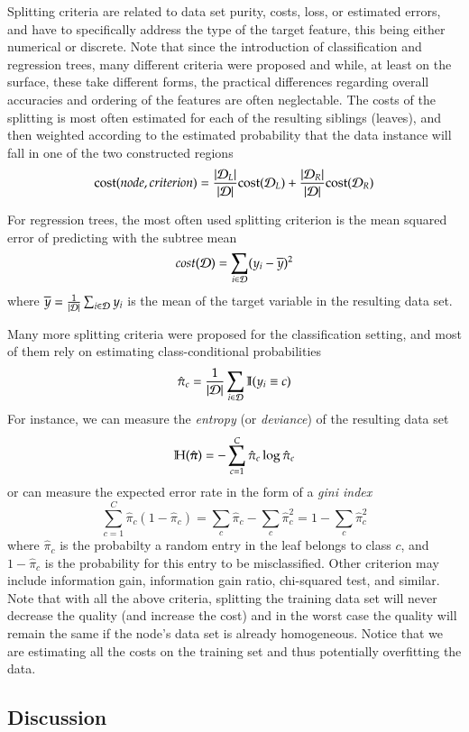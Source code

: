 \begin{refsection}
Splitting criteria are related to data set purity, costs, loss, or estimated errors, and have to specifically address the type of the target feature, this being either numerical or discrete. Note that since the introduction of classification and regression trees, many different criteria were proposed and while, at least on the surface, these take different forms, the practical differences regarding overall accuracies and ordering of the features are often neglectable. The costs of the splitting is most often estimated for each of the resulting siblings (leaves), and then weighted according to the estimated probability that the data instance will fall in one of the two constructed regions
$$ {\rm cost}(node, criterion) = {|\mathcal{D}_L|\over |\mathcal{D}|}{\rm cost}(\mathcal{D}_L) + {|\mathcal{D}_R|\over |\mathcal{D}|}{\rm cost}(\mathcal{D}_R) $$

For regression trees, the most often used splitting criterion is the mean squared error of predicting with the subtree mean
$$ cost(\mathcal{D}) = \sum_{i\in\mathcal{D}}(y_i-\overline{y})^2 $$
where $\overline{y} = {1\over|\mathcal{D}|}\sum_{i\in\mathcal{D}}y_i$ is the mean of the target variable in the resulting data set.

Many more splitting criteria were proposed for the classification setting, and most of them rely on estimating class-conditional probabilities
$$ \hat{\pi}_c = {1\over|\mathcal{D}|}\sum_{i\in\mathcal{D}}\mathbb{I}(y_i\equiv c) $$
For instance, we can measure the {\em entropy} (or {\em deviance}) of the resulting data set
$$ \mathbb{H}(\hat{\boldsymbol{\pi}}) = -\sum_{c=1}^C \hat{\pi}_c \log \hat{\pi}_c $$
or can measure the expected error rate in the form of a {\em gini index}
$$ \sum_{c=1}^C \hat{\pi}_c (1-\hat{\pi}_c) = \sum_c \hat{\pi}_c - \sum_c \hat{\pi}_c^2 = 1 - \sum_c \hat{\pi}_c^2 $$
where $\hat{\pi}_c$ is the probabilty a random entry in the leaf belongs to class $c$, and $1-\hat{\pi}_c$ is the probability for this entry to be misclassified. Other criterion may include information gain, information gain ratio, chi-squared test, and similar. Note that with all the above criteria, splitting the training data set will never decrease the quality (and increase the cost) and in the worst case the quality will remain the same if the node's data set is already homogeneous. Notice that we are estimating all the costs on the training set and thus potentially overfitting the data.

\subsection*{Discussion}


\end{refsection}
